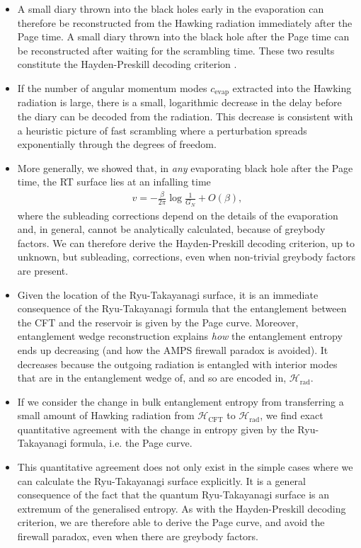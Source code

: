 \documentclass[12pt]{article}
\begin{document}
\begin{itemize}
\item A small diary thrown into the black holes early in the evaporation can therefore be reconstructed from the Hawking radiation immediately after the Page time. A small diary thrown into the black hole after the Page time can be reconstructed after waiting for the scrambling time. These two results constitute the Hayden-Preskill decoding criterion \cite{hayden2007black}.

\item If the number of angular momentum modes $c_\text{evap}$ extracted into the Hawking radiation is large, there is a small, logarithmic decrease in the delay before the diary can be decoded from the radiation. This decrease is consistent with a heuristic picture of fast scrambling where a perturbation spreads exponentially through the degrees of freedom.

\item More generally, we showed that, in \emph{any} evaporating black hole after the Page time, the RT surface lies at an infalling time
\begin{align}
v = - \frac{\beta}{2 \pi} \log\frac{1}{G_N} + O(\beta),
\end{align}
where the subleading corrections depend on the details of the evaporation and, in general, cannot be analytically calculated, because of greybody factors. We can therefore derive the Hayden-Preskill decoding criterion, up to unknown, but subleading, corrections, even when non-trivial greybody factors are present.

\item Given the location of the Ryu-Takayanagi surface, it is an immediate consequence of the Ryu-Takayanagi formula that the entanglement between the CFT and the reservoir is given by the Page curve. Moreover, entanglement wedge reconstruction explains \emph{how} the entanglement entropy ends up decreasing (and how the AMPS firewall paradox is avoided). It decreases because the outgoing radiation is entangled with interior modes that are in the entanglement wedge of, and so are encoded in, $\mathcal{H}_\text{rad}$. 

\item If we consider the change in bulk entanglement entropy from transferring a small amount of Hawking radiation from $\mathcal{H}_\text{CFT}$ to $\mathcal{H}_\text{rad}$, we find exact quantitative agreement with the change in entropy given by the Ryu-Takayanagi formula, i.e. the Page curve.

\item This quantitative agreement does not only exist in the simple cases where we can calculate the Ryu-Takayanagi surface explicitly. It is a general consequence of the fact that the quantum Ryu-Takayanagi surface is an extremum of the generalised entropy. As with the Hayden-Preskill decoding criterion, we are therefore able to derive the Page curve, and avoid the firewall paradox, even when there are greybody factors.


\end{itemize}
\end{document}
